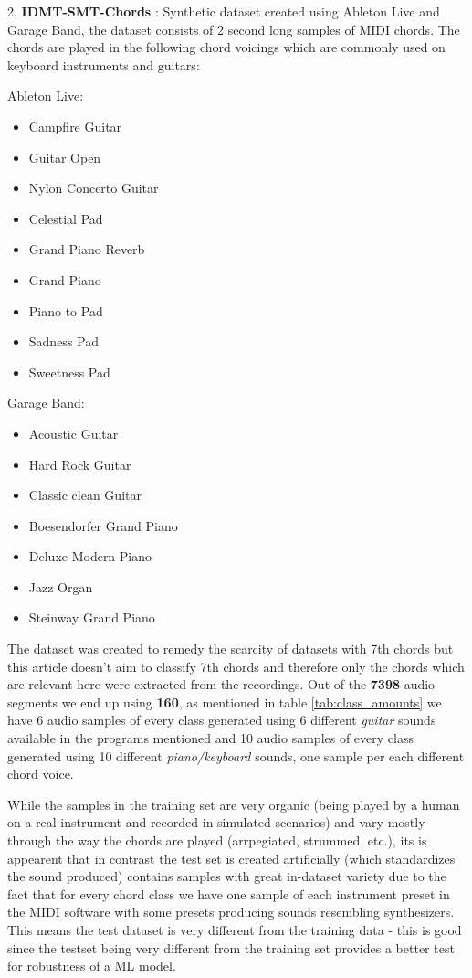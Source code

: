 \documentclass[a4paper]{article}
\begin{document}
2. \textbf{IDMT-SMT-Chords }:
Synthetic dataset \cite{dataset_ood} created using Ableton Live and Garage Band, the dataset consists of 2 second long samples of MIDI chords. The chords are played in the following chord voicings which are commonly used on keyboard instruments and guitars:

\noindent Ableton Live:
\begin{itemize}
    \item Campfire Guitar
    \item Guitar Open
    \item Nylon Concerto Guitar

    \item Celestial Pad
    \item Grand Piano Reverb
    \item Grand Piano
    \item Piano to Pad
    \item Sadness Pad
    \item Sweetness Pad
\end{itemize}

\noindent Garage Band:
\begin{itemize}
    \item Acoustic Guitar
    \item Hard Rock Guitar
    \item Classic clean Guitar

    \item Boesendorfer Grand Piano
    \item Deluxe Modern Piano
    \item Jazz Organ
    \item Steinway Grand Piano
\end{itemize}

The dataset was created to remedy the scarcity of datasets with 7th chords but this article doesn't aim to classify 7th chords and therefore only the chords which are relevant here were extracted from the recordings.
Out of the \textbf{7398} audio segments we end up using \textbf{160}, as mentioned in table \ref{tab:class_amounts} we have 6 audio samples of every class generated using 6 different \emph{guitar} sounds available in the programs mentioned and 10 audio samples of every class generated using 10 different \emph{piano/keyboard} sounds, one sample per each different chord voice.

While the samples in the training set are very organic (being played by a human on a real instrument and recorded in simulated scenarios) and vary mostly through the way the chords are played (arrpegiated, strummed, etc.), its is appearent that in contrast the test set is created artificially (which standardizes the sound produced) contains samples with great in-dataset variety due to the fact that for every chord class we have one sample of each instrument preset in the MIDI software with some presets producing sounds resembling synthesizers. This means the test dataset is very different from the training data - this is good since the testset being very different from the training set provides a better test for robustness of a ML model.
\end{document}
